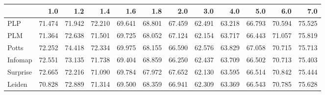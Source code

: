 \begin{tabular}{lrrrrrrrrrrr}
\toprule
{} &    1.0 &    1.2 &    1.4 &    1.6 &    1.8 &    2.0 &    3.0 &    4.0 &    5.0 &    6.0 &    7.0 \\
\midrule
PLP      & 71.474 & 71.942 & 72.210 & 69.641 & 68.801 & 67.459 & 62.491 & 63.218 & 66.793 & 70.594 & 75.525 \\
PLM      & 71.364 & 72.638 & 71.501 & 69.725 & 68.052 & 67.124 & 62.154 & 63.717 & 66.443 & 71.057 & 75.819 \\
Potts    & 72.252 & 74.418 & 72.334 & 69.975 & 68.155 & 66.590 & 62.576 & 63.829 & 67.058 & 70.715 & 75.713 \\
Infomap  & 72.551 & 73.135 & 71.738 & 69.404 & 68.859 & 66.250 & 62.437 & 63.709 & 66.502 & 70.713 & 75.403 \\
Surprise & 72.665 & 72.216 & 71.090 & 69.784 & 67.972 & 67.652 & 62.130 & 63.595 & 66.514 & 70.842 & 75.444 \\
Leiden   & 70.828 & 72.889 & 71.314 & 69.500 & 68.359 & 66.941 & 62.309 & 63.369 & 66.543 & 70.785 & 75.628 \\
\bottomrule
\end{tabular}
